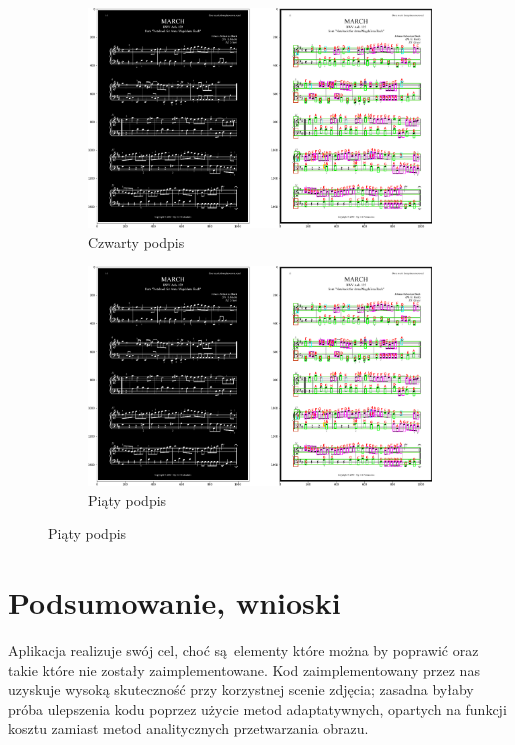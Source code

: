 \documentclass[12pt]{article}
\begin{document}
\begin{figure}[h!]
	\begin{subfigure}[b]{0.48\linewidth}
		\includegraphics[width=\linewidth]{zdjs/Zdj0.png}
		\caption{Czwarty podpis}
	\end{subfigure}
	\begin{subfigure}[b]{0.48\linewidth}
		\includegraphics[width=\linewidth]{zdjs/Zdj0.png}
		\caption{Piąty podpis}
	\end{subfigure}
\end{figure}

\section{Podsumowanie, wnioski}
Aplikacja realizuje swój cel, choć są elementy które można by poprawić oraz takie które nie zostały zaimplementowane. Kod zaimplementowany przez nas uzyskuje wysoką skuteczność przy korzystnej scenie zdjęcia; zasadna byłaby próba ulepszenia kodu poprzez użycie metod adaptatywnych, opartych na funkcji kosztu zamiast metod analitycznych przetwarzania obrazu.
\end{document}
